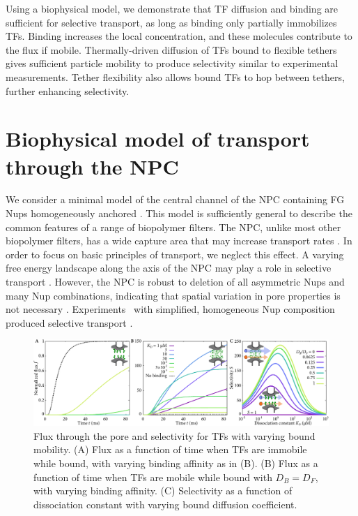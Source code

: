 Using a biophysical model, we demonstrate that TF diffusion and
binding are sufficient for selective transport, as long as binding
only partially immobilizes TFs. Binding increases the local
concentration, and these molecules contribute to the flux if mobile.
Thermally-driven diffusion of TFs bound to flexible tethers gives
sufficient particle mobility to produce selectivity similar to
experimental measurements.  Tether flexibility also allows bound TFs
to hop between tethers, further enhancing selectivity.

\section{Biophysical model of transport through the NPC}

We consider a minimal model of the central channel of the NPC
containing FG Nups homogeneously anchored .  This
model is sufficiently general to describe the common features of a
range of biopolymer filters.  The NPC, unlike most other biopolymer
filters, has a wide capture area that may increase transport rates
\cite{pagliara14}.  In order to focus on basic principles of
transport, we neglect this effect.  A varying free energy landscape
along the axis of the NPC may play a role in selective transport
\cite{zilman07, tagliazucchi13, tu13, timney16}.  However, the NPC is
robust to deletion of all asymmetric Nups and many Nup combinations,
indicating that spatial variation in pore properties is not necessary
\cite{strawn04, zeitler04}.  Experiments \vitro\ with simplified,
homogeneous Nup composition produced selective transport
\cite{kowalczyk11, jovanovic-talisman09}.

\begin{figure}[t!]
\centering
\includegraphics[width=\textwidth]{figs/ch02/fig2.pdf}
\caption{Flux through the pore and selectivity for TFs with varying
  bound mobility. (A) Flux as a function of time when TFs are immobile
  while bound, with varying binding affinity as in (B).  (B) Flux as a function
  of time when TFs are mobile while bound with $D_B = D_F$, with
  varying binding affinity.  (C) Selectivity as a function of
  dissociation constant with varying bound diffusion coefficient. }
\label{fig:transient}
\end{figure}

